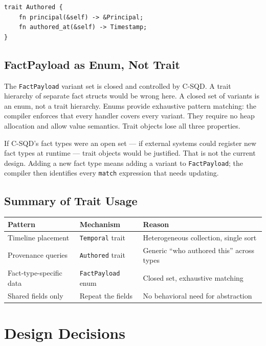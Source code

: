 \documentclass[11pt]{article}
\begin{document}
\begin{lstlisting}
trait Authored {
    fn principal(&self) -> &Principal;
    fn authored_at(&self) -> Timestamp;
}
\end{lstlisting}

\subsection{FactPayload as Enum, Not Trait}
\label{sec:enum-rationale}

The \texttt{FactPayload} variant set is closed and controlled by C-SQD. A
trait hierarchy of separate fact structs would be wrong here. A closed set of
variants is an enum, not a trait hierarchy. Enums provide exhaustive pattern
matching: the compiler enforces that every handler covers every variant. They
require no heap allocation and allow value semantics. Trait objects lose all
three properties.

If C-SQD's fact types were an open set --- if external systems could register
new fact types at runtime --- trait objects would be justified. That is not the
current design. Adding a new fact type means adding a variant to
\texttt{FactPayload}; the compiler then identifies every \texttt{match}
expression that needs updating.

\subsection{Summary of Trait Usage}

\begin{center}
\renewcommand{\arraystretch}{1.3}
\begin{tabular}{l l l}
\textbf{Pattern} & \textbf{Mechanism} & \textbf{Reason} \\
\hline
Timeline placement        & \texttt{Temporal} trait  & Heterogeneous collection, single sort \\
Provenance queries        & \texttt{Authored} trait  & Generic ``who authored this'' across types \\
Fact-type-specific data   & \texttt{FactPayload} enum & Closed set, exhaustive matching \\
Shared fields only        & Repeat the fields         & No behavioral need for abstraction \\
\end{tabular}
\end{center}

\section{Design Decisions}
\label{sec:design}
\end{document}

